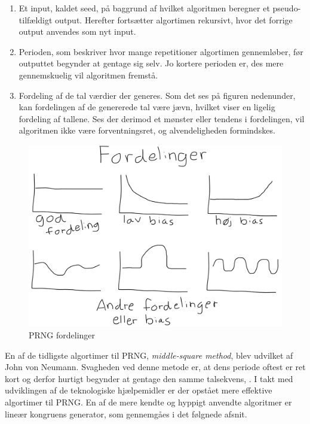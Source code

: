 \documentclass[
]{book}
\theoremstyle{definition}
\theoremstyle{definition}
\theoremstyle{definition}
\theoremstyle{remark}
\begin{document}
\begin{enumerate}
\def\labelenumi{\arabic{enumi}.}
\item
  Et input, kaldet seed, på baggrund af hvilket algoritmen beregner et pseudo-tilfældigt output. Herefter fortsætter algortimen rekursivt, hvor det forrige output anvendes som nyt input.
\item
  Perioden, som beskriver hvor mange repetitioner algortimen gennemløber, før outputtet begynder at gentage sig selv. Jo kortere perioden er, des mere gennemskuelig vil algoritmen fremstå.
\item
  Fordeling af de tal værdier der generes. Som det ses på figuren nedenunder, kan fordelingen af de genererede tal være jævn, hvilket viser en ligelig fordeling af tallene. Ses der derimod et mønster eller tendens i fordelingen, vil algoritmen ikke være forventningsret, og alvendeligheden formindskes.
\end{enumerate}

\begin{figure}

{\centering \includegraphics[width=0.75\linewidth]{images/prngfordelingerDK} 

}

\caption{PRNG fordelinger}\label{fig:unnamed-chunk-1}
\end{figure}

En af de tidligste algortimer til PRNG, \emph{middle-square method}, blev udvilket af John von Neumann. Svagheden ved denne metode er, at dens periode oftest er ret kort og derfor hurtigt begynder at gentage den samme talsekvens, \citep[s. 12-13]{PRNGintro}. I takt med udviklingen af de teknologiske hjælpemidler er der opstået mere effektive algortimer til PRNG. En af de mere kendte og hyppigt anvendte algoritmer er lineær kongruens generator, som gennemgåes i det følgnede afsnit.
\end{document}
